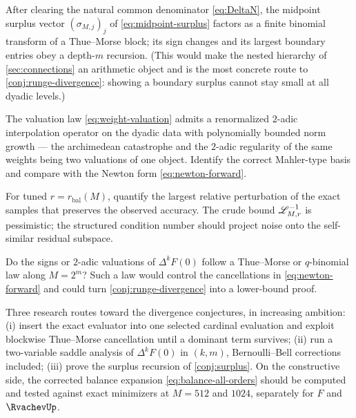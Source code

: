\begin{conjecture}
\label{conj:surplus}
After clearing the natural common denominator
\eqref{eq:DeltaN}, the midpoint surplus vector
$(\sigma_{M,j})_j$ of \eqref{eq:midpoint-surplus} factors as a finite
binomial transform of a Thue--Morse block; its sign changes and its
largest boundary entries obey a depth-$m$ recursion.  (This would
make the nested hierarchy of \cref{sec:connections} an arithmetic
object and is the most concrete route to
\cref{conj:runge-divergence}: showing a boundary surplus cannot stay
small at all dyadic levels.)
\end{conjecture}

\begin{conjecture}
\label{conj:2adic-stability}
The valuation law \eqref{eq:weight-valuation} admits a renormalized
$2$-adic interpolation operator on the dyadic data with polynomially
bounded norm growth --- the archimedean catastrophe and the $2$-adic
regularity of the same weights being two valuations of one object.
Identify the correct Mahler-type basis and compare with the Newton
form \eqref{eq:newton-forward}.
\end{conjecture}

\begin{problem}
For tuned $r=r_{\mathrm{bal}}(M)$, quantify the largest relative
perturbation of the exact samples that preserves the observed
accuracy.  The crude bound $\mathscr L_{M,r}^{-1}$ is pessimistic; the
structured condition number should project noise onto the
self-similar residual subspace.
\end{problem}

\begin{question}
Do the signs or $2$-adic valuations of $\Delta^{k}F(0)$ follow a
Thue--Morse or $q$-binomial law along $M=2^{m}$?  Such a law would
control the cancellations in \eqref{eq:newton-forward} and could turn
\cref{conj:runge-divergence} into a lower-bound proof.
\end{question}

Three research routes toward the divergence conjectures, in
increasing ambition: (i) insert the exact evaluator into one selected
cardinal evaluation and exploit blockwise Thue--Morse cancellation
until a dominant term survives; (ii) run a two-variable saddle
analysis of $\Delta^{k}F(0)$ in $(k,m)$, Bernoulli--Bell corrections
included; (iii) prove the surplus recursion of
\cref{conj:surplus}.  On the constructive side, the corrected balance
expansion \eqref{eq:balance-all-orders} should be computed and tested
against exact minimizers at $M=512$ and $1024$, separately for $F$
and $\RvachevUp$.

